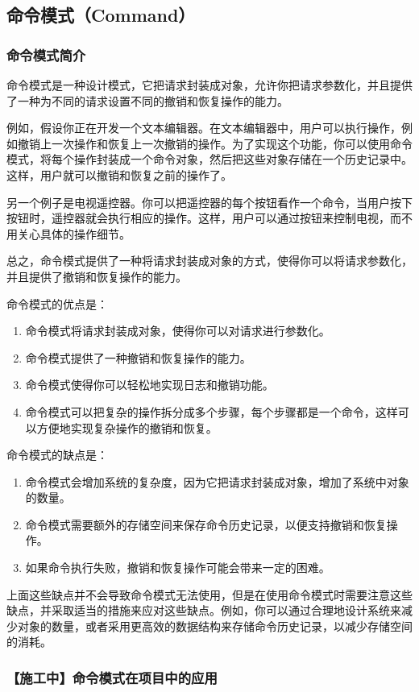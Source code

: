 \subsection{命令模式（Command）}

\subsubsection{命令模式简介}

命令模式是一种设计模式，它把请求封装成对象，允许你把请求参数化，并且提供了一种为不同的请求设置不同的撤销和恢复操作的能力。

例如，假设你正在开发一个文本编辑器。在文本编辑器中，用户可以执行操作，例如撤销上一次操作和恢复上一次撤销的操作。为了实现这个功能，你可以使用命令模式，将每个操作封装成一个命令对象，然后把这些对象存储在一个历史记录中。这样，用户就可以撤销和恢复之前的操作了。

另一个例子是电视遥控器。你可以把遥控器的每个按钮看作一个命令，当用户按下按钮时，遥控器就会执行相应的操作。这样，用户可以通过按钮来控制电视，而不用关心具体的操作细节。

总之，命令模式提供了一种将请求封装成对象的方式，使得你可以将请求参数化，并且提供了撤销和恢复操作的能力。

命令模式的优点是：
\begin{enumerate}
    \item 命令模式将请求封装成对象，使得你可以对请求进行参数化。
    \item 命令模式提供了一种撤销和恢复操作的能力。
    \item 命令模式使得你可以轻松地实现日志和撤销功能。
    \item 命令模式可以把复杂的操作拆分成多个步骤，每个步骤都是一个命令，这样可以方便地实现复杂操作的撤销和恢复。
\end{enumerate}

命令模式的缺点是：
\begin{enumerate}
    \item 命令模式会增加系统的复杂度，因为它把请求封装成对象，增加了系统中对象的数量。
    \item 命令模式需要额外的存储空间来保存命令历史记录，以便支持撤销和恢复操作。
    \item 如果命令执行失败，撤销和恢复操作可能会带来一定的困难。
\end{enumerate}
上面这些缺点并不会导致命令模式无法使用，但是在使用命令模式时需要注意这些缺点，并采取适当的措施来应对这些缺点。例如，你可以通过合理地设计系统来减少对象的数量，或者采用更高效的数据结构来存储命令历史记录，以减少存储空间的消耗。

\subsubsection{【施工中】命令模式在项目中的应用}



